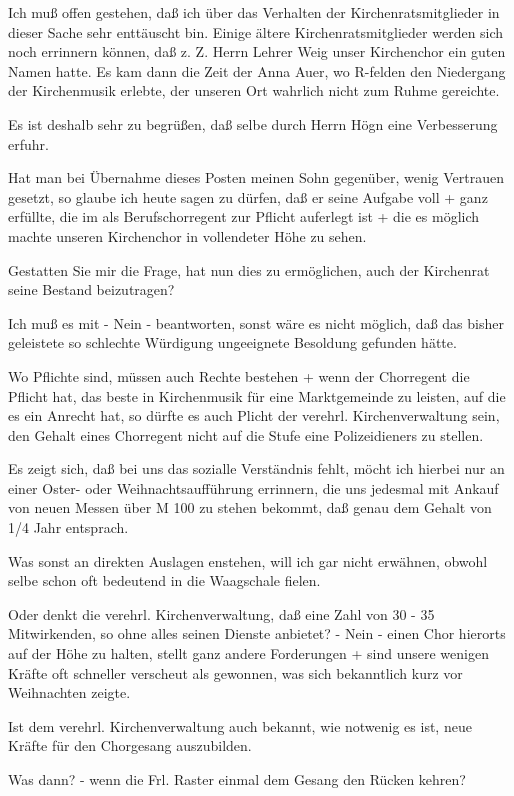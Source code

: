 Ich muß offen gestehen, daß ich über das Verhalten der Kirchenratsmitglieder in
dieser Sache sehr enttäuscht bin. Einige ältere Kirchenratsmitglieder werden
sich noch errinnern können, daß z. Z. Herrn Lehrer Weig unser Kirchenchor ein
guten Namen hatte. Es kam dann die Zeit der Anna Auer, wo R-felden den
Niedergang der Kirchenmusik erlebte, der unseren Ort wahrlich nicht zum Ruhme
gereichte.

Es ist deshalb sehr zu begrüßen, daß selbe durch Herrn Högn eine Verbesserung
erfuhr.

Hat man bei Übernahme dieses Posten meinen Sohn gegenüber, wenig Vertrauen
gesetzt, so glaube ich heute sagen zu dürfen, daß er seine Aufgabe voll + ganz
erfüllte, die im als Berufschorregent zur Pflicht auferlegt ist + die es möglich
machte unseren Kirchenchor in vollendeter Höhe zu sehen.

Gestatten Sie mir die Frage, hat nun dies zu ermöglichen, auch der Kirchenrat
seine Bestand beizutragen?

Ich muß es mit - Nein - beantworten, sonst wäre es nicht möglich, daß das bisher
geleistete so schlechte Würdigung ungeeignete Besoldung gefunden hätte.

Wo Pflichte sind, müssen auch Rechte bestehen + wenn der Chorregent die Pflicht
hat, das beste in Kirchenmusik für eine Marktgemeinde zu leisten, auf die es ein
Anrecht hat, so dürfte es auch Plicht der verehrl. Kirchenverwaltung sein, den
Gehalt eines Chorregent nicht auf die Stufe eine Polizeidieners zu stellen.

Es zeigt sich, daß bei uns das sozialle Verständnis fehlt, möcht ich hierbei nur
an einer Oster- oder Weihnachtsaufführung errinnern, die uns jedesmal mit Ankauf
von neuen Messen über M 100 zu stehen bekommt, daß genau dem Gehalt von 1/4 Jahr
entsprach.

Was sonst an direkten Auslagen enstehen, will ich gar nicht erwähnen, obwohl
selbe schon oft bedeutend in die Waagschale fielen.

Oder denkt die verehrl. Kirchenverwaltung, daß eine Zahl von 30 - 35
Mitwirkenden, so ohne alles seinen Dienste anbietet? - Nein - einen Chor
hierorts auf der Höhe zu halten, stellt ganz andere Forderungen + sind unsere
wenigen Kräfte oft schneller verscheut als gewonnen, was sich bekanntlich kurz
vor Weihnachten zeigte.

Ist dem verehrl. Kirchenverwaltung auch bekannt, wie notwenig es ist, neue
Kräfte für den Chorgesang auszubilden.

Was dann? - wenn die Frl. Raster einmal dem Gesang den Rücken kehren?

